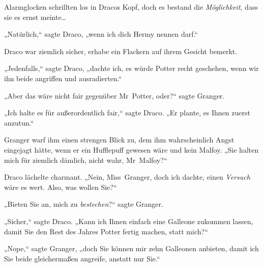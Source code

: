 Alarmglocken schrillten los in Dracos Kopf, doch es bestand die \emph{Möglichkeit}, dass sie es ernst meinte…

„Natürlich,“ sagte Draco, „wenn ich dich Hermy nennen darf.“

Draco war ziemlich sicher, erhabe ein Flackern auf ihrem Gesicht bemerkt.

„Jedenfalls,“ sagte Draco, „dachte ich, es würde Potter recht geschehen, wenn wir ihn beide angriffen und ausradierten.“

„Aber das wäre nicht fair gegenüber Mr~Potter, oder?“ sagte Granger.

„Ich halte es für außerordentlich fair,“ sagte Draco. „Er plante, es Ihnen zuerst anzutun.“

Granger warf ihm einen strengen Blick zu, dem ihm wahrscheinlich Angst eingejagt hätte, wenn er ein Hufflepuff gewesen wäre und kein Malfoy. „Sie halten mich für ziemlich dämlich, nicht wahr, Mr~Malfoy?“

Draco lächelte charmant. „Nein, Miss~Granger, doch ich dachte, einen \emph{Versuch} wäre es wert. Also, was wollen Sie?“

„Bieten Sie an, mich zu \emph{bestechen}?“ sagte Granger.

„Sicher,“ sagte Draco. „Kann ich Ihnen einfach eine Galleone zukommen lassen, damit Sie den Rest des Jahres Potter fertig machen, statt mich?“

„Nope,“ sagte Granger, „doch Sie können mir zehn Galleonen anbieten, damit ich Sie beide gleichermaßen angreife, anstatt nur Sie.“

